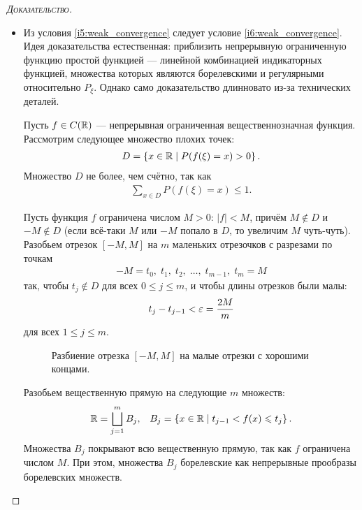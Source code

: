 \documentclass[../main.tex]{subfiles}
\begin{document}
\begin{proof}[\normalfont\textsc{Доказательство}]
\begin{itemize}
  \item Из условия \ref{i5:weak_convergence} следует условие \ref{i6:weak_convergence}. Идея доказательства естественная: приблизить непрерывную ограниченную функцию простой функцией --- линейной комбинацией индикаторных функцией, множества которых являются борелевскими и регулярными относительно $ P_\xi $. Однако само доказательство длинновато из-за технических деталей.

   Пусть $ f \in C(\mathbb{R})$ --- непрерывная ограниченная вещественнозначная функция. Рассмотрим следующее множество плохих точек:
   \begin{align*}
    D = \left\{ x \in \mathbb{R} \mid P(f(\xi) = x) > 0 \right\}.
   \end{align*} Множество $ D $ не более, чем счётно, так как
   \begin{align*}
    \sum_{x \in D} P(f(\xi) = x) \leqslant 1.
   \end{align*}

   Пусть функция $ f $ ограничена числом $ M > 0 $:  $ \left| f \right| < M $, причём $ M \notin D $ и $ -M \notin D $ (если всё-таки $ M $ или $ -M $ попало в $ D $, то увеличим $ M $ чуть-чуть). Разобьем отрезок $ [-M,M] $ на $ m $ маленьких отрезочков с разрезами по точкам
   \begin{align*}
    -M = t_0,\;t_1,\;t_2,\;\ldots,\;t_{m-1},\;t_m=M
   \end{align*} так, чтобы $ t_j \notin D $ для всех $ 0 \leqslant j \leqslant m $, и чтобы длины отрезков были малы:
   \begin{align*}
    t_j - t_{j-1} < \varepsilon = \frac{2M}{m}
   \end{align*} для всех $ 1 \leqslant j \leqslant m $.
   \begin{figure}[ht]
    \centering
    \caption{Разбиение отрезка $[-M, M]$ на малые отрезки с хорошими концами.}
    \label{fig:7_points_theorem_cut_m}
   \end{figure}

   Разобьем вещественную прямую на следующие $ m $ множеств:
   \begin{align*}
    \mathbb{R} = \bigsqcup_{j=1}^{m} B_j, &&
    B_j=\left\{x\in\mathbb{R}\mid t_{j-1} < f(x) \leqslant t_j\right\}.
   \end{align*} Множества $ B_j $ покрывают всю вещественную прямую, так как $ f $ ограничена числом $ M $. При этом, множества $ B_j $ борелевские как непрерывные прообразы борелевских множеств.


\end{itemize}
\end{proof}
\end{document}
